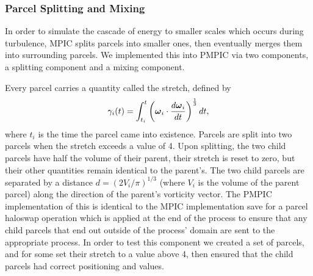 \documentclass{article}
\newcommand{\gv}[1]{\ensuremath{\mbox{\boldmath$ #1 $}}}
\renewcommand{\d}[2]{\frac{d #1}{d #2}} %
\begin{document}
\subsubsection{Parcel Splitting and Mixing}
In order to simulate the cascade of energy to smaller scales which occurs during turbulence, MPIC splits parcels into smaller ones, then eventually merges them into surrounding parcels. We implemented this into PMPIC via two components, a splitting component and a mixing component.

Every parcel carries a quantity called the stretch, defined by
\begin{equation}
  \gamma_i(t) = \int_{t_i}^{t} \left(\gv{\omega}_i \cdot \d{\gv{\omega}_i}{t} \right)^{\frac{1}{3}} dt,
\end{equation}
where $t_i$ is the time the parcel came into existence. Parcels are split into two parcels when the stretch exceeds a value of 4. Upon splitting, the two child parcels have half the volume of their parent, their stretch is reset to zero, but their other quantities remain identical to the parent's. The two child parcels are separated by a distance $d = (2V_i/\pi)^{1/3}$ (where $V_i$ is the volume of the parent parcel) along the direction of the parent's vorticity vector. The PMPIC implementation of this is identical to the MPIC implementation save for a parcel haloswap operation which is applied at the end of the process to ensure that any child parcels that end out outside of the process' domain are sent to the appropriate process. In order to test this component we created a set of parcels, and for some set their stretch to a value above 4, then ensured that the child parcels had correct positioning and values.
\end{document}
